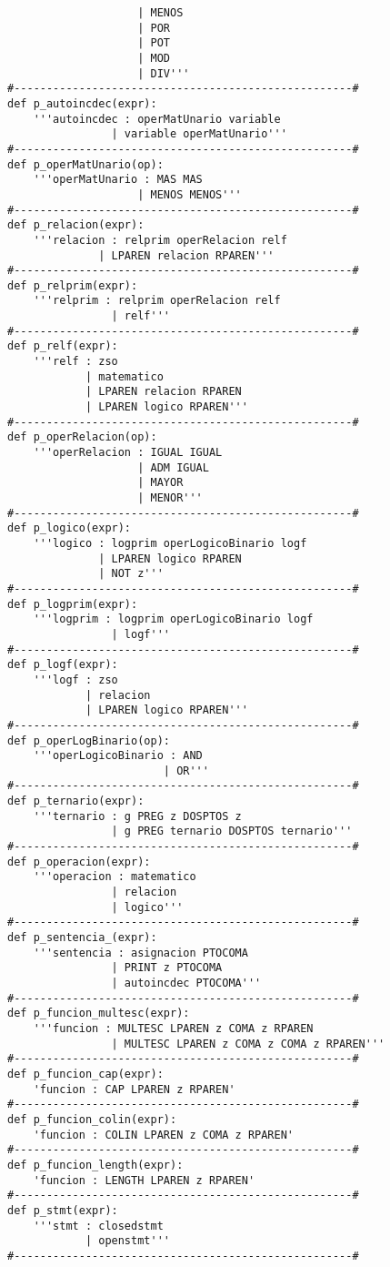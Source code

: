 \begin{verbatim}
					| MENOS
					| POR
					| POT
					| MOD
					| DIV'''
#----------------------------------------------------#
def p_autoincdec(expr):
	'''autoincdec : operMatUnario variable
				| variable operMatUnario'''
#----------------------------------------------------#
def p_operMatUnario(op):
	'''operMatUnario : MAS MAS
					| MENOS MENOS'''
#----------------------------------------------------#
def p_relacion(expr):
	'''relacion : relprim operRelacion relf
			  | LPAREN relacion RPAREN'''
#----------------------------------------------------#
def p_relprim(expr):		   
	'''relprim : relprim operRelacion relf
				| relf'''
#----------------------------------------------------#
def p_relf(expr):
	'''relf : zso
			| matematico
			| LPAREN relacion RPAREN
			| LPAREN logico RPAREN'''
#----------------------------------------------------#
def p_operRelacion(op):
	'''operRelacion : IGUAL IGUAL
					| ADM IGUAL
					| MAYOR
					| MENOR'''
#----------------------------------------------------#
def p_logico(expr):
	'''logico : logprim operLogicoBinario logf
			  | LPAREN logico RPAREN
			  | NOT z'''
#----------------------------------------------------#
def p_logprim(expr):
	'''logprim : logprim operLogicoBinario logf
				| logf'''
#----------------------------------------------------#
def p_logf(expr):
	'''logf : zso
			| relacion
			| LPAREN logico RPAREN'''
#----------------------------------------------------#
def p_operLogBinario(op):
	'''operLogicoBinario : AND
						| OR'''
#----------------------------------------------------#
def p_ternario(expr):
	'''ternario : g PREG z DOSPTOS z
				| g PREG ternario DOSPTOS ternario'''
#----------------------------------------------------#
def p_operacion(expr):
	'''operacion : matematico
				| relacion
				| logico'''
#----------------------------------------------------#
def p_sentencia_(expr):
	'''sentencia : asignacion PTOCOMA
				| PRINT z PTOCOMA
				| autoincdec PTOCOMA'''
#----------------------------------------------------#
def p_funcion_multesc(expr):
	'''funcion : MULTESC LPAREN z COMA z RPAREN
				| MULTESC LPAREN z COMA z COMA z RPAREN'''
#----------------------------------------------------#
def p_funcion_cap(expr):
	'funcion : CAP LPAREN z RPAREN'
#----------------------------------------------------#
def p_funcion_colin(expr):
	'funcion : COLIN LPAREN z COMA z RPAREN'
#----------------------------------------------------#
def p_funcion_length(expr):
	'funcion : LENGTH LPAREN z RPAREN'
#----------------------------------------------------#
def p_stmt(expr):
	'''stmt : closedstmt
			| openstmt'''
#----------------------------------------------------#

\end{verbatim}
